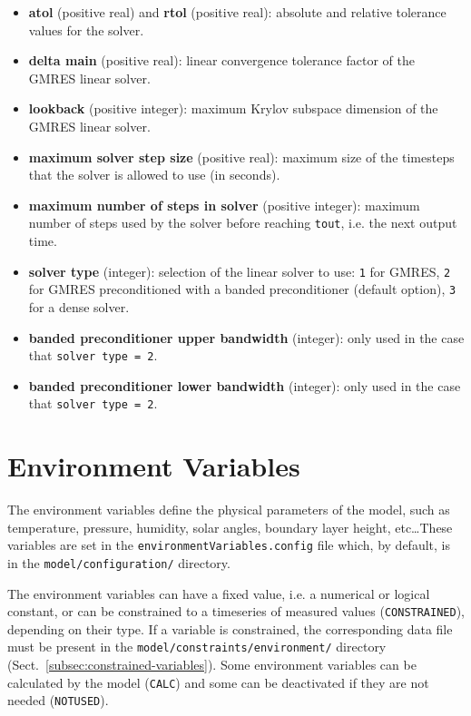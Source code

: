 \begin{itemize}
\item \textbf{atol} (positive real) and \textbf{rtol} (positive real):
  absolute and relative tolerance values for the solver.
\item \textbf{delta main} (positive real): linear convergence
  tolerance factor of the GMRES linear solver.
\item \textbf{lookback} (positive integer): maximum Krylov subspace
  dimension of the GMRES linear solver.
\item \textbf{maximum solver step size} (positive real): maximum size
  of the timesteps that the solver is allowed to use (in seconds).
\item \textbf{maximum number of steps in solver} (positive integer):
  maximum number of steps used by the solver before reaching
  \texttt{tout}, i.e. the next output time.
\item \textbf{solver type} (integer): selection of the linear solver
  to use: \texttt{1} for GMRES, \texttt{2} for GMRES preconditioned
  with a banded preconditioner (default option), \texttt{3} for a
  dense solver.
\item \textbf{banded preconditioner upper bandwidth} (integer): only
  used in the case that \texttt{solver\ type\ =\ 2}.
\item \textbf{banded preconditioner lower bandwidth} (integer): only
  used in the case that \texttt{solver\ type\ =\ 2}.
\end{itemize}

\section{Environment Variables} \label{sec:environment-variables}

The environment variables define the physical parameters of the model, such
as temperature, pressure, humidity, solar angles, boundary layer height,
etc\ldots These variables are set in the \texttt{environmentVariables.config}
file which, by default, is in the \texttt{model/configuration/} directory.

The environment variables can have a fixed value, i.e. a numerical or
logical constant, or can be constrained to a timeseries of measured
values (\texttt{CONSTRAINED}), depending on their type. If a variable
is constrained, the corresponding data file must be present in
the \texttt{model/constraints/environment/} directory
(Sect.~\ref{subsec:constrained-variables}). Some environment variables
can be calculated by the model (\texttt{CALC}) and some can be
deactivated if they are not needed (\texttt{NOTUSED}).

